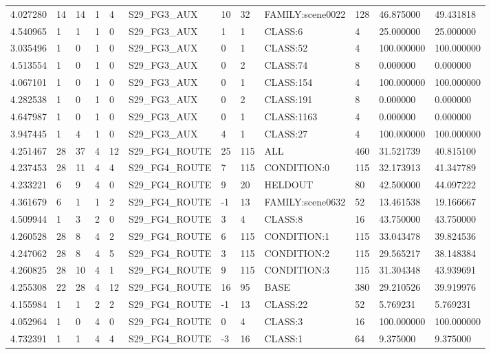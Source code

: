 \begin{tabular}{llllllllllll}
4.027280 & 14 & 14 & 1 & 4 & S29\_FG3\_AUX & 10 & 32 & FAMILY:scene0022 & 128 & 46.875000 & 49.431818 \\
4.540965 & 1 & 1 & 1 & 0 & S29\_FG3\_AUX & 1 & 1 & CLASS:6 & 4 & 25.000000 & 25.000000 \\
3.035496 & 1 & 0 & 1 & 0 & S29\_FG3\_AUX & 0 & 1 & CLASS:52 & 4 & 100.000000 & 100.000000 \\
4.513554 & 1 & 0 & 1 & 0 & S29\_FG3\_AUX & 0 & 2 & CLASS:74 & 8 & 0.000000 & 0.000000 \\
4.067101 & 1 & 0 & 1 & 0 & S29\_FG3\_AUX & 0 & 1 & CLASS:154 & 4 & 100.000000 & 100.000000 \\
4.282538 & 1 & 0 & 1 & 0 & S29\_FG3\_AUX & 0 & 2 & CLASS:191 & 8 & 0.000000 & 0.000000 \\
4.647987 & 1 & 0 & 1 & 0 & S29\_FG3\_AUX & 0 & 1 & CLASS:1163 & 4 & 0.000000 & 0.000000 \\
3.947445 & 1 & 4 & 1 & 0 & S29\_FG3\_AUX & 4 & 1 & CLASS:27 & 4 & 100.000000 & 100.000000 \\
4.251467 & 28 & 37 & 4 & 12 & S29\_FG4\_ROUTE & 25 & 115 & ALL & 460 & 31.521739 & 40.815100 \\
4.237453 & 28 & 11 & 4 & 4 & S29\_FG4\_ROUTE & 7 & 115 & CONDITION:0 & 115 & 32.173913 & 41.347789 \\
4.233221 & 6 & 9 & 4 & 0 & S29\_FG4\_ROUTE & 9 & 20 & HELDOUT & 80 & 42.500000 & 44.097222 \\
4.361679 & 6 & 1 & 1 & 2 & S29\_FG4\_ROUTE & -1 & 13 & FAMILY:scene0632 & 52 & 13.461538 & 19.166667 \\
4.509944 & 1 & 3 & 2 & 0 & S29\_FG4\_ROUTE & 3 & 4 & CLASS:8 & 16 & 43.750000 & 43.750000 \\
4.260528 & 28 & 8 & 4 & 2 & S29\_FG4\_ROUTE & 6 & 115 & CONDITION:1 & 115 & 33.043478 & 39.824536 \\
4.247062 & 28 & 8 & 4 & 5 & S29\_FG4\_ROUTE & 3 & 115 & CONDITION:2 & 115 & 29.565217 & 38.148384 \\
4.260825 & 28 & 10 & 4 & 1 & S29\_FG4\_ROUTE & 9 & 115 & CONDITION:3 & 115 & 31.304348 & 43.939691 \\
4.255308 & 22 & 28 & 4 & 12 & S29\_FG4\_ROUTE & 16 & 95 & BASE & 380 & 29.210526 & 39.919976 \\
4.155984 & 1 & 1 & 2 & 2 & S29\_FG4\_ROUTE & -1 & 13 & CLASS:22 & 52 & 5.769231 & 5.769231 \\
4.052964 & 1 & 0 & 4 & 0 & S29\_FG4\_ROUTE & 0 & 4 & CLASS:3 & 16 & 100.000000 & 100.000000 \\
4.732391 & 1 & 1 & 4 & 4 & S29\_FG4\_ROUTE & -3 & 16 & CLASS:1 & 64 & 9.375000 & 9.375000 \\

\end{tabular}
